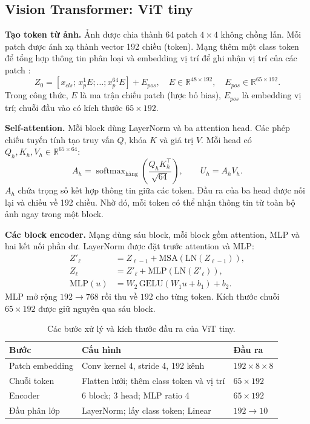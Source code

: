 \subsection{Vision Transformer: ViT tiny}
\textbf{Tạo token từ ảnh.} Ảnh được chia thành 64 patch $4\times4$ không
chồng lấn. Mỗi patch được ánh xạ thành vector 192 chiều (token).
Mạng thêm một class token để tổng hợp thông tin phân loại và embedding
vị trí để ghi nhận vị trí của các patch \cite{dosovitskiy2021vit}:
\begin{equation}
 Z_0=[x_{cls};\,x_p^1E;\ldots;x_p^{64}E]+E_{pos},\quad
 E\in\mathbb{R}^{48\times192},\quad E_{pos}\in\mathbb{R}^{65\times192}.
\end{equation}
Trong công thức, $E$ là ma trận chiếu patch (lược bỏ bias),
$E_{pos}$ là embedding vị trí; chuỗi đầu vào có kích thước $65\times192$.

\textbf{Self-attention.} Mỗi block dùng LayerNorm và ba attention head.
Các phép chiếu tuyến tính tạo truy vấn $Q$, khóa $K$ và giá trị $V$.
Mỗi head có
$Q_h,K_h,V_h\in\mathbb{R}^{65\times64}$:
\begin{equation}
 A_h=\operatorname{softmax}_{\mathrm{hàng}}\left(
 \frac{Q_hK_h^\top}{\sqrt{64}}\right),\qquad U_h=A_hV_h.
\end{equation}
$A_h$ chứa trọng số kết hợp thông tin giữa các token. Đầu ra của ba head
được nối lại và chiếu về 192 chiều. Nhờ đó, mỗi token có thể nhận thông
tin từ toàn bộ ảnh ngay trong một block.

\textbf{Các block encoder.} Mạng dùng sáu block, mỗi block gồm attention,
MLP và hai kết nối phần dư. LayerNorm được đặt trước attention và MLP:
\begin{align}
 Z'_\ell&=Z_{\ell-1}+\mathrm{MSA}(\mathrm{LN}(Z_{\ell-1})),\\
 Z_\ell&=Z'_\ell+\mathrm{MLP}(\mathrm{LN}(Z'_\ell)),\\
 \mathrm{MLP}(u)&=W_2\,\mathrm{GELU}(W_1u+b_1)+b_2.
\end{align}
MLP mở rộng $192\rightarrow768$ rồi thu về $192$ cho từng token.
Kích thước chuỗi $65\times192$ được giữ nguyên qua sáu block.

\begin{table}[H]
\centering\small
\caption{Các bước xử lý và kích thước đầu ra của ViT tiny.}
\begin{tabular}{lll}
\toprule
Bước & Cấu hình & Đầu ra \\
\midrule
Patch embedding & Conv kernel 4, stride 4, 192 kênh & $192\times8\times8$ \\
Chuỗi token & Flatten lưới; thêm class token và vị trí & $65\times192$ \\
Encoder & 6 block; 3 head; MLP ratio 4 & $65\times192$ \\
Đầu phân lớp & LayerNorm; lấy class token; Linear & $192\rightarrow10$ \\
\bottomrule
\end{tabular}
\end{table}

